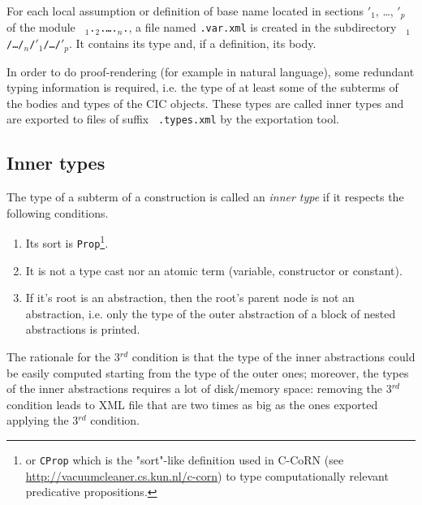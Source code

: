 For each local assumption or definition of base name {\ident} located
in sections {\ident$'_1$}, {\ldots}, {\ident$'_p$} of the module {\tt
{\ident$_1$}.{\ident$_2$}.{\ldots}.{\ident$_n$}.{\ident}}, a file
named {\tt {\ident}.var.xml} is created in the subdirectory {\tt
{\ident$_1$}/{\ldots}/{\ident$_n$}/{\ident$'_1$}/\ldots/{\ident$'_p$}}.
It contains its type and, if a definition, its body.

In order to do proof-rendering (for example in natural language), some
redundant typing information is required, i.e. the type of at least
some of the subterms of the bodies and types of the CIC objects. These
types are called inner types and are exported to files of suffix {\tt
.types.xml} by the exportation tool.




\subsection[Inner types]{Inner types\label{inner-types}}

The type of a subterm of a construction is called an {\em inner type}
if it respects the following conditions.
 
\begin{enumerate}
  \item Its sort is \verb+Prop+\footnote{or {\tt CProp} which is the
    "sort"-like definition used in C-CoRN (see
    \url{http://vacuumcleaner.cs.kun.nl/c-corn}) to type
    computationally relevant predicative propositions.}.
 \item It is not a type cast nor an atomic term (variable, constructor or constant).
 \item If it's root is an abstraction, then the root's parent node is
    not an abstraction, i.e. only the type of the outer abstraction of
    a block of nested abstractions is printed.
\end{enumerate}
                                                                               
The rationale for the 3$^{rd}$ condition is that the type of the inner
abstractions could be easily computed starting from the type of the
outer ones; moreover, the types of the inner abstractions requires a
lot of disk/memory space: removing the 3$^{rd}$ condition leads to XML
file that are two times as big as the ones exported applying the 3$^{rd}$
condition.

